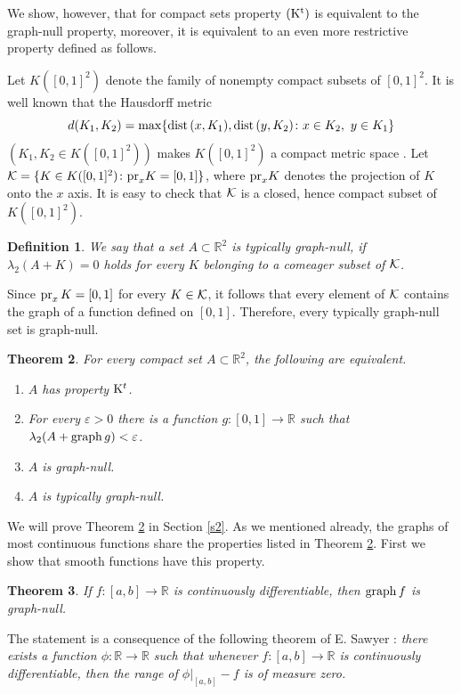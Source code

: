 \documentclass[12pt]{article}
\newtheorem{theorem}{Theorem}[section]
\newtheorem{defin}[theorem]{Definition}
\def\rr{{\mathbb R}}
\def\kk{{\cal K}}
\def\sik{{\rr}^2}
\def\su{\subset}
\def\ep{\varepsilon}
\def\la{\lambda}
\def\nl{[0,1]}
\def\proof{\noindent {\bf Proof.} }
\def\graph{{\rm graph}\, }
\def\dist{{\rm dist}\, }
\def\pr{{\rm pr}_x \, }
\begin{document}
We show, however, that for compact sets property ${\rm (K^t)}$
is equivalent to the graph-null property, moreover, it is equivalent to an
even more restrictive property defined as follows.

Let $K(\nl ^2 )$ denote the family of nonempty compact subsets of $\nl ^2$.
It is well known that the Hausdorff metric
$$d(K_1 ,K_2 )=\max \{ \dist (x,K_1) , \dist (y,K_2) \colon x\in K_2 , \
y\in K_1 \}$$
$(K_1 ,K_2 \in K(\nl ^2 ))$  makes $K(\nl ^2 )$ a compact metric space
\cite[Theorem 4.26, p. 26]{K}. Let $\kk =\{ K\in K(\nl ^2 ) \colon
{\rm pr}_x K =\nl \}$, where  ${\rm pr}_x K$ denotes the projection of $K$ onto
the $x$ axis. It is easy to check that $\kk$ is a closed, hence compact subset
of $K(\nl ^2 )$.
\begin{defin}
{\rm We say that a set $A\su \sik$ is {\it typically graph-null}, if
$\la _2 (A+K)=0$ holds for every $K$ belonging to a comeager subset of $\kk$.}
\end{defin}
Since $\pr K=\nl$ for every $K\in \kk$, it follows that every element of $\kk$
contains the graph of a function defined on $\nl$. Therefore, every typically
graph-null set is graph-null.
\begin{theorem} \label{t1}
For every compact set $A\su \sik$, the following are equivalent.
\begin{enumerate}[{\rm (i)}]
\item $A$ has property ${\rm K}^t$.
\item For every $\ep >0$  there is a function $g\colon \nl \to \rr$ such that 
$\la _2 (A+\graph g)<\ep$.
\item $A$ is graph-null.
\item $A$ is typically graph-null.
\end{enumerate}  
\end{theorem}
We will prove Theorem \ref{t1} in Section \ref{s2}.
As we mentioned already, the graphs of most continuous functions share
the properties listed in Theorem \ref{t1}. First we show that smooth functions
have this property.
\begin{theorem} \label{t2}
If $f\colon [a,b] \to \rr$ is continuously differenti\-able, then
\hbox{$\graph f$} is graph-null.  
\end{theorem}
\proof
The statement is a consequence of the following theorem of E. Sawyer
\cite{S}: {\it there exists a function $\phi \colon \rr \to \rr$ such that
whenever $f\colon [a,b] \to \rr$ is continuously differentiable, then the
range of $\phi |_{[a,b]} -f$ is of measure zero.}
\end{document}
